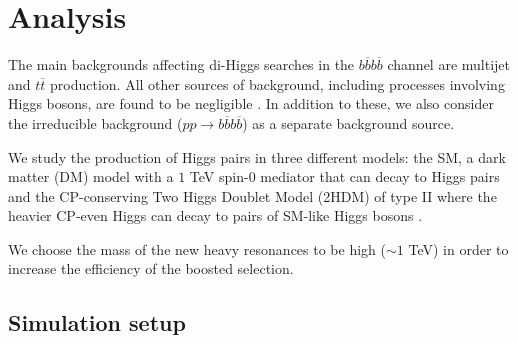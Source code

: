 
\section{Analysis}
\label{sec:imple}


The main backgrounds affecting di-Higgs searches in the $b\overline{b}b\overline{b}$ channel are multijet and $t\overline{t}$ production. All other sources of background, including processes involving Higgs bosons, are found to be negligible \cite{hh2bbbbATLAS1}. In addition to these, we also consider the irreducible background ($pp\rightarrow b\overline{b}b\overline{b}$) as a separate background source.

We study the production of Higgs pairs in three different models: the SM, a dark matter (DM) model with a $1$ TeV spin-$0$ mediator that can decay to Higgs pairs \cite{DM} and the CP-conserving Two Higgs Doublet Model (2HDM) of type II where the heavier CP-even Higgs can decay to pairs of SM-like Higgs bosons \cite{2HDM}.

We choose the mass of the new heavy resonances to be high ($\sim 1$ TeV) in order to increase the efficiency of the boosted selection.

\subsection{Simulation setup}
\label{sec:sim}

